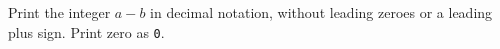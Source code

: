 Print the integer $a-b$ in decimal notation, without leading zeroes or a leading plus sign. Print zero as \texttt{0}.
